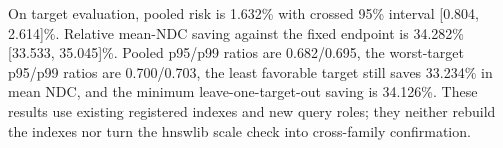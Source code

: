 \documentclass[sigconf,anonymous]{acmart}
\begin{document}
On target evaluation, pooled risk is 1.632\% with crossed 95\% interval [0.804, 2.614]\%. Relative mean-NDC saving against the fixed endpoint is 34.282\% [33.533, 35.045]\%. Pooled p95/p99 ratios are 0.682/0.695, the worst-target p95/p99 ratios are 0.700/0.703, the least favorable target still saves 33.234\% in mean NDC, and the minimum leave-one-target-out saving is 34.126\%. These results use existing registered indexes and new query roles; they neither rebuild the indexes nor turn the hnswlib scale check into cross-family confirmation.
\end{document}
